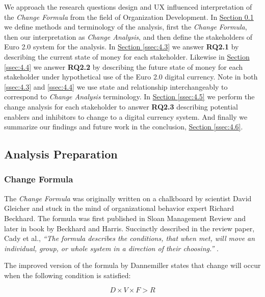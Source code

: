\documentclass[12pt]{article} %
\newcommand{\hypersectionref}[1]{\hyperref[#1]{Section \ref{#1}}}
\begin{document}
{We approach the research questions design and UX influenced interpretation of the \textit{Change Formula} from the field of Organization Development\cite{dannemiller1992}. In \hypersectionref{ssec:4.2} we define methods and terminology of the analysis, first the \textit{Change Formula}, then our interpretation as \textit{Change Analysis}, and then define the stakeholders of Euro 2.0 system for the analysis. In \hypersectionref{ssec:4.3} we answer \textbf{RQ2.1} by describing the current state of money for each stakeholder. Likewise in \hypersectionref{ssec:4.4} we answer \textbf{RQ2.2} by describing the future state of money for each stakeholder under hypothetical use of the Euro 2.0 digital currency. Note in both \ref{ssec:4.3} and \ref{ssec:4.4} we use state and relationship interchangeably to correspond to \textit{Change Analysis} terminology. In \hypersectionref{ssec:4.5} we perform the change analysis for each stakeholder to answer \textbf{RQ2.3} describing potential enablers and inhibitors to change to a digital currency system. And finally we summarize our findings and future work in the conclusion, \hypersectionref{ssec:4.6}.

\subsection{Analysis Preparation} \label{ssec:4.2}

\subsubsection{Change Formula} \label{sssec:4.2:changeFormula}
The \textit{Change Formula} was originally written on a chalkboard by scientist David Gleicher and stuck in the mind of organizational behavior expert Richard Beckhard\cite{changeFormula2014}. The formula was first published in Sloan Management Review\cite{beckhard1975} and later in book by Beckhard and Harris\cite{organizationalTransitions1977}. Succinctly described in the review paper, Cady et al., \textit{``The formula describes the conditions, that when met, will move an individual, group, or whole system in a direction of their choosing.''} \cite{changeFormula2014}.

The improved version of the formula by Dannemiller\cite{dannemiller1992} states that change will occur when the following condition is satisfied:

\begin{equation}
	D \times V \times F > R
\end{equation}

}
\end{document}
